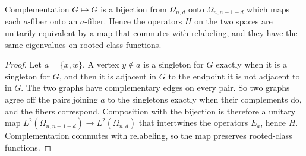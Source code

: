 \begin{lemma}[Complement]\label{edg:complement}
Complementation $G\mapsto\overline G$ is a bijection from $\Omega_{n,d}$ onto
$\Omega_{n,n-1-d}$ which maps each $a$-fiber onto an $a$-fiber. Hence the
operators $H$ on the two spaces are unitarily equivalent by a map that
commutes with relabeling, and they have the same eigenvalues on rooted-class
functions.
\end{lemma}

\begin{proof}
Let $a=\{x,w\}$. A vertex $y\notin a$ is a singleton for $G$ exactly when it is
a singleton for $\overline G$, and then it is adjacent in $\overline G$ to the
endpoint it is not adjacent to in $G$. The two graphs have complementary
edges on every pair. So two graphs agree off the pairs joining $a$ to the
singletons exactly when their complements do, and the fibers correspond.
Composition with the bijection is therefore a unitary map
$L^2(\Omega_{n,n-1-d})\to L^2(\Omega_{n,d})$ that intertwines the operators
$E_a$, hence $H$. Complementation commutes with relabeling, so the map
preserves rooted-class functions.
\end{proof}
